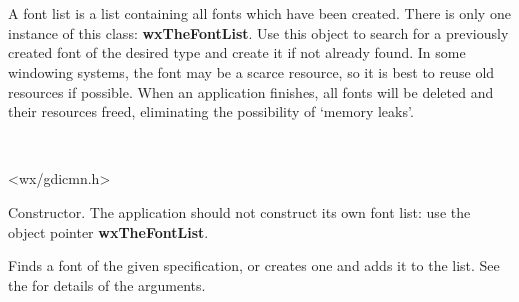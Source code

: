 \section{}\label{wxfontlist}

A font list is a list containing all fonts which have been created. There
is only one instance of this class: {\bf wxTheFontList}.  Use this object to search
for a previously created font of the desired type and create it if not already found.
In some windowing systems, the font may be a scarce resource, so it is best to
reuse old resources if possible.  When an application finishes, all fonts will be
deleted and their resources freed, eliminating the possibility of `memory leaks'.


\\


<wx/gdicmn.h>






\label{wxfontlistctor}


Constructor. The application should not construct its own font list:
use the object pointer {\bf wxTheFontList}.

\label{findorcreatefont}


Finds a font of the given specification, or creates one and adds it to the list. See the  for
details of the arguments.

